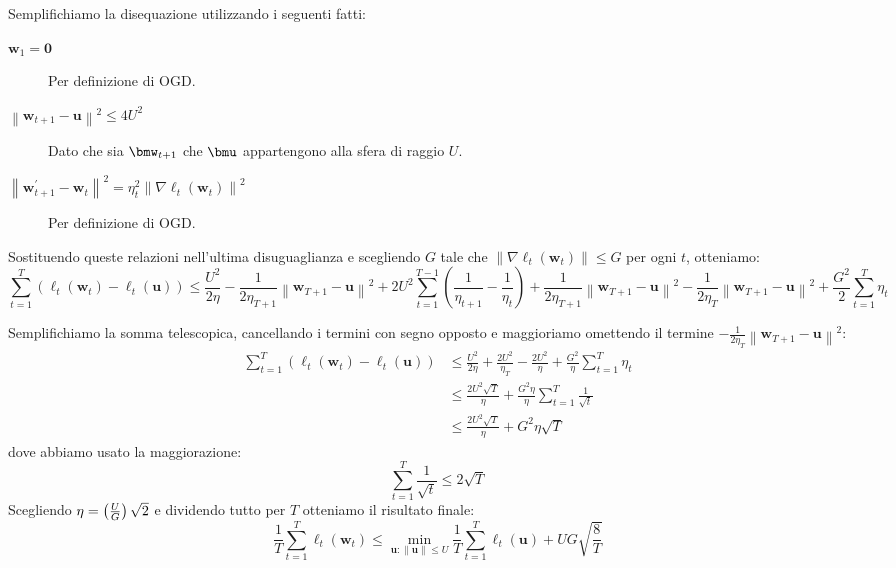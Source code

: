\documentclass[\main/main.tex]{subfiles}
\begin{document}
\begin{analysis}
\[    \]
    Semplifichiamo la disequazione utilizzando i seguenti fatti:
    \begin{description}
        \item[\(\boldsymbol{w}_{1}=\mathbf{0}\)] Per definizione di OGD.
        \item[\(\left\|\boldsymbol{w}_{t+1}-\boldsymbol{u}\right\|^{2} \leq 4 U^{2}\)] Dato che sia \(\bmw_{t+1}\) che \(\bmu\) appartengono alla sfera di raggio \(U\).
        \item[\(\left\|\boldsymbol{w}_{t+1}^{\prime}-\boldsymbol{w}_{t}\right\|^{2}=\eta_{t}^{2}\left\|\nabla \ell_{t}\left(\boldsymbol{w}_{t}\right)\right\|^{2}\)] Per definizione di OGD.
    \end{description}
    Sostituendo queste relazioni nell'ultima disuguaglianza e scegliendo \(G\) tale che \(\left\|\nabla \ell_{t}\left(\boldsymbol{w}_{t}\right)\right\| \leq G\) per ogni \(t\), otteniamo:
    \[
        \sum_{t=1}^{T}\left(\ell_{t}\left(\boldsymbol{w}_{t}\right)-\ell_{t}(\boldsymbol{u})\right) \leq \frac{U^{2}}{2 \eta}-\frac{1}{2 \eta_{T+1}}\left\|\boldsymbol{w}_{T+1}-\boldsymbol{u}\right\|^{2} +2 U^{2} \sum_{t=1}^{T-1}\left(\frac{1}{\eta_{t+1}}-\frac{1}{\eta_{t}}\right)+\frac{1}{2 \eta_{T+1}}\left\|\boldsymbol{w}_{T+1}-\boldsymbol{u}\right\|^{2}-\frac{1}{2 \eta_{T}}\left\|\boldsymbol{w}_{T+1}-\boldsymbol{u}\right\|^{2}+\frac{G^{2}}{2} \sum_{t=1}^{T} \eta_{t}
    \]
    \vspace{0.5em}
    \begin{multicols}{2}
        Semplifichiamo la somma telescopica, cancellando i termini con segno opposto e maggioriamo omettendo il termine \(-\frac{1}{2 \eta_{T}}\left\|\boldsymbol{w}_{T+1}-\boldsymbol{u}\right\|^{2}\):
        \begin{align*} \sum_{t=1}^{T}\left(\ell_{t}\left(\boldsymbol{w}_{t}\right)-\ell_{t}(\boldsymbol{u})\right) & \leq \frac{U^{2}}{2 \eta}+\frac{2 U^{2}}{\eta_{T}}-\frac{2 U^{2}}{\eta}+\frac{G^{2}}{\eta} \sum_{t=1}^{T} \eta_{t}\\&\leq \frac{2 U^{2} \sqrt{T}}{\eta}+\frac{G^{2} \eta}{\eta} \sum_{t=1}^{T} \frac{1}{\sqrt{t}} \\ & \leq \frac{2 U^{2} \sqrt{T}}{\eta}+G^{2} \eta \sqrt{T} \end{align*}
        dove abbiamo usato la maggiorazione:
        \[\sum_{t=1}^{T} \frac{1}{\sqrt{t}} \leq 2 \sqrt{T}\]
        Scegliendo \(\eta = \left(\frac{U}{G}\right)\sqrt{2}\) e dividendo tutto per \(T\) otteniamo il risultato finale:
        \[\frac{1}{T} \sum_{t=1}^{T} \ell_{t}\left(\boldsymbol{w}_{t}\right) \leq \min _{\boldsymbol{u} :\|\boldsymbol{u}\| \leq U} \frac{1}{T} \sum_{t=1}^{T} \ell_{t}(\boldsymbol{u})+U G \sqrt{\frac{8}{T}}\]
    \end{multicols}
\end{analysis}
\end{document}
